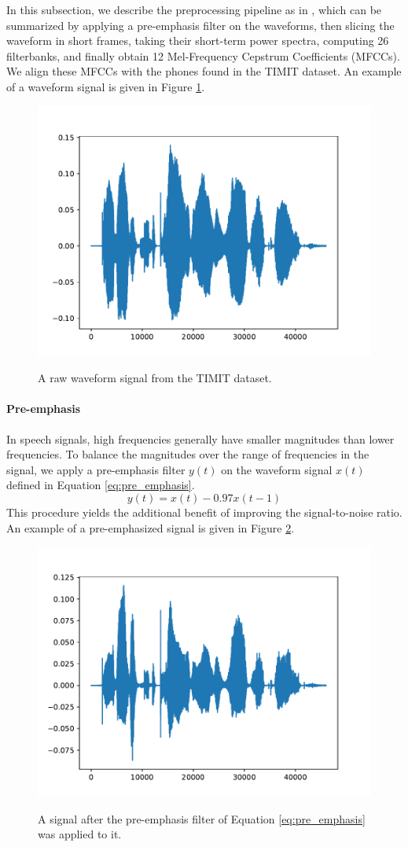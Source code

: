 		In this subsection, we describe the preprocessing pipeline as in \cite{fayek2016}, which can be summarized by applying a pre-emphasis filter on the waveforms, then slicing the waveform in short frames, taking their short-term power spectra, computing 26 filterbanks, and finally obtain 12 Mel-Frequency Cepstrum Coefficients (MFCCs).
		We align these MFCCs with the phones found in the TIMIT dataset.
		An example of a waveform signal is given in Figure \ref{fig:signal}.
			\begin{figure}[ht]
				\centering
			    \includegraphics[width=.45\linewidth]{gfx/signal}
			    \label{fig:signal}
			    \caption{A raw waveform signal from the TIMIT dataset.}
			\end{figure}

		\paragraph{Pre-emphasis}

			In speech signals, high frequencies generally have smaller magnitudes than lower frequencies.
			To balance the magnitudes over the range of frequencies in the signal, we apply a pre-emphasis filter $y(t)$ on the waveform signal $x(t)$ defined in Equation \ref{eq:pre_emphasis}.
			\begin{equation}\label{eq:pre_emphasis}
				y(t) = x(t) - 0.97x(t-1)
			\end{equation}
			This procedure yields the additional benefit of improving the signal-to-noise ratio.
			An example of a pre-emphasized signal is given in Figure \ref{fig:signalemph}.
			\begin{figure}[ht]
				\centering
			    \includegraphics[width=.45\linewidth]{gfx/signalemph}
			    \label{fig:signalemph}
			    \caption[Pre-emphasis]{A signal after the pre-emphasis filter of Equation \ref{eq:pre_emphasis} was applied to it.}
			\end{figure}

